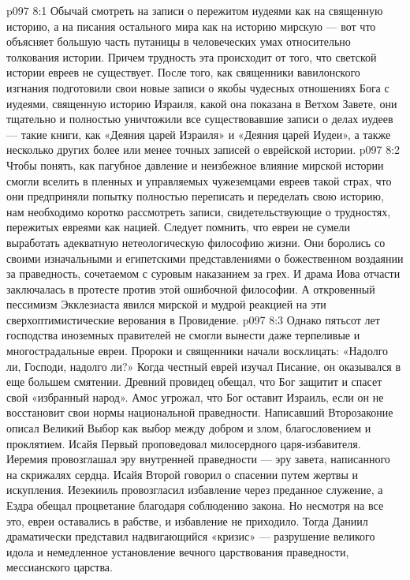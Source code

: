 \vs p097 8:1 Обычай смотреть на записи о пережитом иудеями как на священную историю, а на писания остального мира как на историю мирскую --- вот что объясняет большую часть путаницы в человеческих умах относительно толкования истории. Причем трудность эта происходит от того, что светской истории евреев не существует. После того, как священники вавилонского изгнания подготовили свои новые записи о якобы чудесных отношениях Бога с иудеями, священную историю Израиля, какой она показана в Ветхом Завете, они тщательно и полностью уничтожили все существовавшие записи о делах иудеев --- такие книги, как «Деяния царей Израиля» и «Деяния царей Иудеи», а также несколько других более или менее точных записей о еврейской истории.
\vs p097 8:2 Чтобы понять, как пагубное давление и неизбежное влияние мирской истории смогли вселить в пленных и управляемых чужеземцами евреев такой страх, что они предприняли попытку полностью переписать и переделать свою историю, нам необходимо коротко рассмотреть записи, свидетельствующие о трудностях, пережитых евреями как нацией. Следует помнить, что евреи не сумели выработать адекватную нетеологическую философию жизни. Они боролись со своими изначальными и египетскими представлениями о божественном воздаянии за праведность, сочетаемом с суровым наказанием за грех. И драма Иова отчасти заключалась в протесте против этой ошибочной философии. А откровенный пессимизм Экклезиаста явился мирской и мудрой реакцией на эти сверхоптимистические верования в Провидение.
\vs p097 8:3 Однако пятьсот лет господства иноземных правителей не смогли вынести даже терпеливые и многострадальные евреи. Пророки и священники начали восклицать: «Надолго ли, Господи, надолго ли?» Когда честный еврей изучал Писание, он оказывался в еще большем смятении. Древний провидец обещал, что Бог защитит и спасет свой «избранный народ». Амос угрожал, что Бог оставит Израиль, если он не восстановит свои нормы национальной праведности. Написавший Второзаконие описал Великий Выбор как выбор между добром и злом, благословением и проклятием. Исайя Первый проповедовал милосердного царя\hyp{}избавителя. Иеремия провозглашал эру внутренней праведности --- эру завета, написанного на скрижалях сердца. Исайя Второй говорил о спасении путем жертвы и искупления. Иезекииль провозгласил избавление через преданное служение, а Ездра обещал процветание благодаря соблюдению закона. Но несмотря на все это, евреи оставались в рабстве, и избавление не приходило. Тогда Даниил драматически представил надвигающийся «кризис» --- разрушение великого идола и немедленное установление вечного царствования праведности, мессианского царства.

